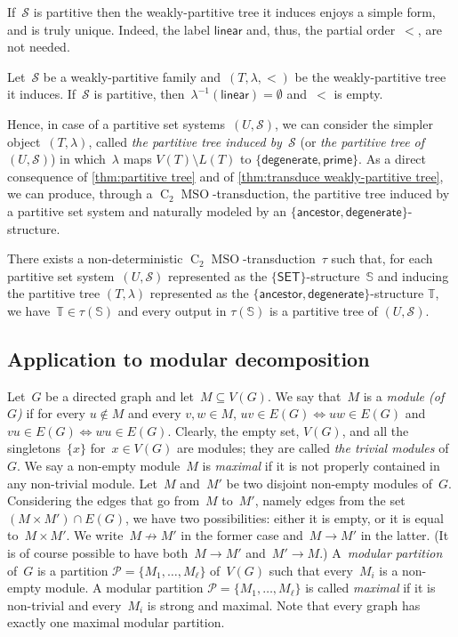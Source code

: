 \documentclass{lmcs} %
\newcommand*\defd[2][\em\color{red!25!black}]{{#1#2}}
\newcommand*{\fullsucc}[3][\to]{\ensuremath{#2\text{$#1$}#3}}
\def\nfullsucc{\fullsucc[\not\to]}
\newcommand{\MSO}{\ensuremath{\operatorname{MSO}}\xspace}
\newcommand{\CMSO}[1][]{\ensuremath{\C[#1]{\!\!}\MSO}\xspace}
\newcommand{\C}[1][]{\ensuremath{\operatorname{C}_{#1}}\xspace}
\newcommand{\ancestor}{\mathsf{ancestor}}
\newcommand{\SET}{\ensuremath{\mathsf{SET}}\xspace}
\newcommand\DEGENERATE{\ensuremath{\mathsf{degenerate}}\xspace}
\newcommand\PRIME{\ensuremath{\mathsf{prime}}\xspace}
\newcommand\LINEAR{\ensuremath{\mathsf{linear}}\xspace}
\begin{document}
If~$\mathcal{S}$ is partitive
then the weakly-partitive tree it induces enjoys a simple form,
and is truly unique.
Indeed, the label $\LINEAR$ and, thus, the partial order~$<$, are not needed.%
\begin{thmC}
    \label{thm:partitive tree}
    Let~$\mathcal{S}$ be a weakly-partitive family
    and~$(T,\lambda,<)$ be the weakly-partitive tree it induces.
    If~$\mathcal{S}$ is partitive,
    then~$\lambda^{-1}(\LINEAR)=\emptyset$ and~$<$ is empty.
\end{thmC}
Hence, in case of a partitive set systems~$(U,\mathcal{S})$,
we can consider the simpler object~$(T,\lambda)$,
called \defd{the partitive tree induced by~$\mathcal{S}$}
(or \defd{the partitive tree of~$(U,\mathcal{S})$})
in which~$\lambda$ maps $V(T)\setminus L(T)$ to $\{\DEGENERATE,\PRIME\}$.
%
As a direct consequence of \autoref{thm:partitive tree} and of \autoref{thm:transduce weakly-partitive tree},
we can produce, through a \CMSO[2]-transduction,
the partitive tree induced by a partitive set system
and naturally modeled by an $\{\ancestor,\DEGENERATE\}$-structure.
\begin{cor}
    \label{cor:transduce partitive tree}%
    There exists a non-deterministic \CMSO[2]-transduction~$\tau$
    such that,
    for each partitive set system~$(U,\mathcal{S})$
    represented as the $\{\SET\}$-structure~$\mathbb{S}$
    and inducing the partitive tree $(T,\lambda)$
    represented as the $\{\ancestor,\DEGENERATE\}$-structure $\mathbb{T}$,
    we have~$\mathbb{T}\in\tau(\mathbb{S})$
    and every output in $\tau(\mathbb{S})$ is a partitive tree of $(U,\mathcal{S})$.
\end{cor}

\subsection{Application to modular decomposition}\label{sec:modular-dec}
Let~$G$ be a directed graph
and let~$M\subseteq V(G)$.
We say that~$M$ is a \defd{module (of~$G$)}
if for every $u\notin M$ and every $v,w\in M$,
${uv\in E(G)\!\iff\! uw\in E(G)}$
and~${vu\in E(G)\!\iff\! wu\in E(G)}$.
Clearly,
the empty set, $V(G)$, and all the singletons~$\{x\}$ for~$x\in V(G)$
are modules;
they are called \defd{the trivial modules} of~$G$.
We say a non-empty module~$M$ is \defd{maximal}
if it is not properly contained in any non-trivial module.
Let~$M$ and~$M'$ be two disjoint non-empty modules of~$G$.
Considering the edges that go from~$M$ to~$M'$,
namely edges from the set $(M\times M')\cap E(G)$,
we have two possibilities:
either it is empty, or it is equal to~$M\times M'$.
We write~\defd{$\nfullsucc{M}{M'}$} in the former case
and~\defd{$\fullsucc{M}{M'}$} in the latter.
(It is of course possible to have both~$\fullsucc{M}{M'}$ and~$\fullsucc{M'}{M}$.)
%
A~\defd{modular partition} of~$G$
is a partition $\mathcal{P}=\{M_1,\ldots,M_\ell\}$ of~$V(G)$
such that every~$M_i$ is a non-empty module.
A modular partition $\mathcal{P}=\{M_1,\dots,M_\ell\}$ is called \defd{maximal}
if it is non-trivial and every~$M_i$ is strong and maximal.
Note that every graph has exactly one maximal modular partition.
\end{document}
